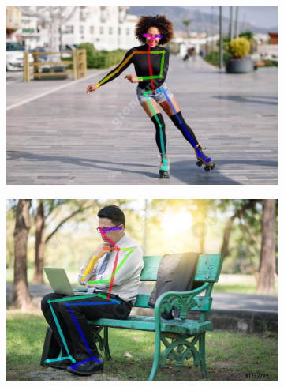 \begin{figure}[h]
\begin{subfigure}[b]{.5\textwidth}
	\centering
	\includegraphics[width=\textwidth]{./images/OpenPose/19}
	\caption{ }
\end{subfigure}
\begin{subfigure}[b]{.5\textwidth}
	\centering
   \includegraphics[width=\textwidth]{./images/OpenPose/23}
   \caption{ }
\end{subfigure}
\begin{subfigure}[b]{.5\textwidth}
	\centering

\end{subfigure}
\end{figure}
